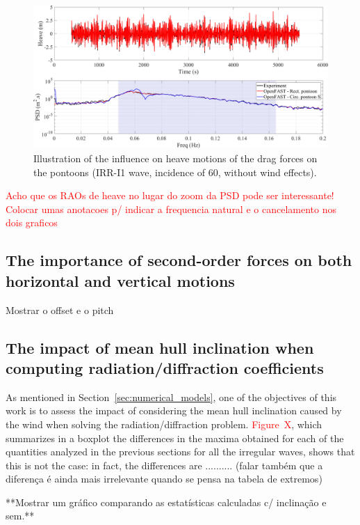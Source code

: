 \begin{figure}[!hbtp]
	\centering
	\includegraphics[width=\textwidth]{./figures/ptfmheave-drag_pontoon.png}	
	\caption{Illustration of the influence on heave motions of the drag forces on the pontoons (IRR-I1 wave, incidence of 60\textdegree{}, without wind effects).} \label{fig:exp_vs_num:drag:ptfmheave}
\end{figure}


\textcolor{red}{Acho que os RAOs de heave no lugar do zoom da PSD pode ser interessante! Colocar umas anotacoes p/ indicar a frequencia natural e o cancelamento nos dois graficos}


\subsection{The importance of second-order forces on both horizontal and vertical motions} \label{subsec:exp_vs_num:2nd_order}
Mostrar o offset e o pitch

\subsection{The impact of mean hull inclination when computing  radiation/diffraction coefficients} \label{subsec:exp_vs_num:impact_inclination}
As mentioned in Section~\ref{sec:numerical_models}, one of the objectives of this work is to assess the impact of considering the mean hull inclination caused by the wind when solving the radiation/diffraction problem. \textcolor{red}{Figure~X}, which summarizes in a boxplot the differences in the maxima obtained for each of the quantities analyzed in the previous sections for all the irregular waves, shows that this is not the case: in fact, the differences are .......... (falar também que a diferença é ainda mais irrelevante quando se pensa na tabela de extremos)

**Mostrar um gráfico comparando as estatísticas calculadas c/ inclinação e sem.**

